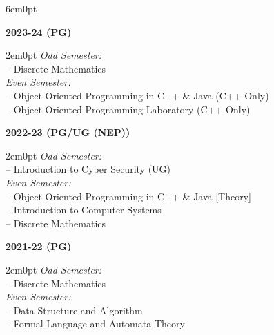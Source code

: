 \documentclass[11pt,a4paper]{moderncv}
\begin{document}
\begin{adjustwidth}{6em}{0pt}
	
	\textbf{2023-24 (PG)}
	
	\begin{adjustwidth}{2em}{0pt}
		\textit{Odd Semester:} \\
		\hspace*{1.5em}-- Discrete Mathematics \\
		
		\textit{Even Semester:} \\
		\hspace*{1.5em}-- Object Oriented Programming in C++ \& Java (C++ Only) \\
		\hspace*{1.5em}-- Object Oriented Programming Laboratory (C++ Only) \\
	\end{adjustwidth}
	
	
	\textbf{2022-23 (PG/UG (NEP))}
	
	\begin{adjustwidth}{2em}{0pt}
		\textit{Odd Semester:} \\
		\hspace*{1.5em}-- Introduction to Cyber Security (UG) \\
		
		\textit{Even Semester:} \\
		\hspace*{1.5em}-- Object Oriented Programming in C++ \& Java [Theory] \\
		\hspace*{1.5em}-- Introduction to Computer Systems \\
		\hspace*{1.5em}-- Discrete Mathematics \\
	\end{adjustwidth}
	
	
	\textbf{2021-22 (PG)}
	
	\begin{adjustwidth}{2em}{0pt}
		\textit{Odd Semester:} \\
		\hspace*{1.5em}-- Discrete Mathematics \\
		
		\textit{Even Semester:} \\
		\hspace*{1.5em}-- Data Structure and Algorithm \\
		\hspace*{1.5em}-- Formal Language and Automata Theory \\
	\end{adjustwidth}
	

\end{adjustwidth}
\end{document}
